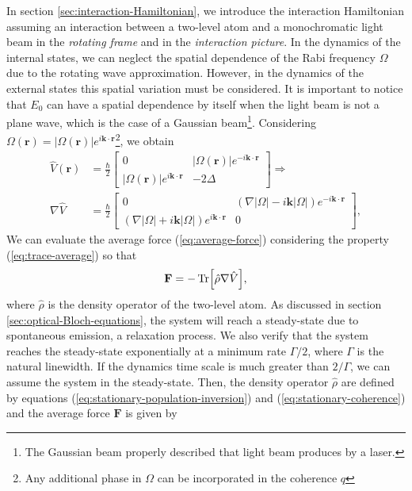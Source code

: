 {In section \ref{sec:interaction-Hamiltonian}, we introduce the interaction Hamiltonian assuming an interaction between a two-level atom and a monochromatic light beam in the \textit{rotating frame} and in the \textit{interaction picture}. In the dynamics of the internal states, we can neglect the spatial dependence of the Rabi frequency $ \Omega $ due to the rotating wave approximation. However, in the dynamics of the external states this spatial variation must be considered. It is important to notice that $ E_0 $ can have a spatial dependence by itself when the light beam is not a plane wave, which is the case of a Gaussian beam\footnote{The Gaussian beam properly described that light beam produces by a laser.}. Considering $ \Omega(\mathbf{r}) = |\Omega(\mathbf{r})| e^{i\mathbf{k}\cdot\mathbf{r}} $\footnote{Any additional phase in $ \Omega $ can be incorporated in the coherence $ q $}, we obtain
\begin{align}
	\hat{V}(\mathbf{r}) &= \frac{\hbar}{2}\left[ \begin{matrix} 0 & |\Omega(\mathbf{r})| e^{-i\mathbf{k}\cdot\mathbf{r}} \\ |\Omega(\mathbf{r})| e^{i\mathbf{k}\cdot\mathbf{r}} & -2\Delta \end{matrix} \right] \Rightarrow \\
	\nabla \hat{V} &= \frac{\hbar}{2}\left[ \begin{matrix} 0 & (\nabla|\Omega| - i\mathbf{k}|\Omega|)e^{-i\mathbf{k}\cdot\mathbf{r}} \\ (\nabla|\Omega| + i\mathbf{k}|\Omega|) e^{i\mathbf{k}\cdot\mathbf{r}} & 0 \end{matrix} \right],
\end{align}
We can evaluate the average force (\ref{eq:average-force}) considering the property (\ref{eq:trace-average}) so that
\begin{equation}
	\mathbf{F} = -\Tr[\hat{\rho}\nabla\hat{V}],
\end{equation}
where $ \hat{\rho} $ is the density operator of the two-level atom. As discussed in section \ref{sec:optical-Bloch-equations}, the system will reach a steady-state due to spontaneous emission, a relaxation process. We also verify that the system reaches the steady-state exponentially at a minimum rate $ \Gamma / 2 $, where $ \Gamma $ is the natural linewidth. If the dynamics time scale is much greater than $ 2 / \Gamma $, we can assume the system in the steady-state. Then, the density operator $ \hat{\rho} $ are defined by equations (\ref{eq:stationary-population-inversion}) and (\ref{eq:stationary-coherence}) and the average force $ \mathbf{F} $ is given by
}
